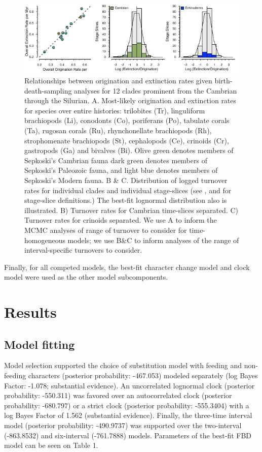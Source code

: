 \documentclass{article}
\begin{document}
\begin{figure}
  \includegraphics[width=\textwidth]{figures/Turnover PaleoStyle.pdf}

  \caption{Relationships between origination and extinction rates given birth-death-sampling analyses for 12 clades prominent from the Cambrian through the Silurian.  A. Most-likely origination and extinction rates for species over entire histories: trilobites (Tr), linguliform brachiopods (Li), conodonts (Co), poriferans (Po), tabulate corals (Ta), rugosan corals (Ru), rhynchonellate brachiopods (Rh), strophomenate brachiopods (St), cephalopods (Ce), crinoids (Cr), gastropods (Ga) and bivalves (Bi). Olive green denotes members of Sepkoski's Cambrian fauna \citep{Sepkoski1981} dark green denotes members of Sepkoski's Paleozoic fauna, and light blue denotes members of Sepkoski's Modern fauna. B \& C. Distribution of logged turnover rates for individual clades and individual stage-slices (see \cite{Bergstrom2009}, \cite{Cramer2011} and \cite{Rasmussen2019} for stage-slice definitions.)  The best-fit lognormal distribution also is illustrated.  B) Turnover rates for Cambrian time-slices separated.  C) Turnover rates for crinoids separated.  We use A to inform the MCMC analyses of range of turnover to consider for time-homogeneous models; we use B&C to inform analyses of the range of interval-specific turnovers to consider.}
\end{figure}

Finally, for all competed models, the best-fit character change model and clock model were used as the other model subcomponents.

\section{Results}

\subsection{Model fitting}

Model selection supported the choice of substitution model with feeding and non-feeding characters (posterior probability: -467.053) modeled separately (log Bayes Factor: -1.078; substantial evidence).
An uncorrelated lognormal clock (posterior probability: -550.311) was favored over an autocorrelated clock (posterior probability: -680.797) or a strict clock (posterior probability: -555.3404) with a log Bayes Factor of 1.562 (substantial evidence).
Finally, the three-time interval model (posterior probability: -490.9737) was supported over the two-interval (-863.8532) and six-interval (-761.7888) models. 
Parameters of the best-fit FBD model can be seen on Table 1.
\end{document}
